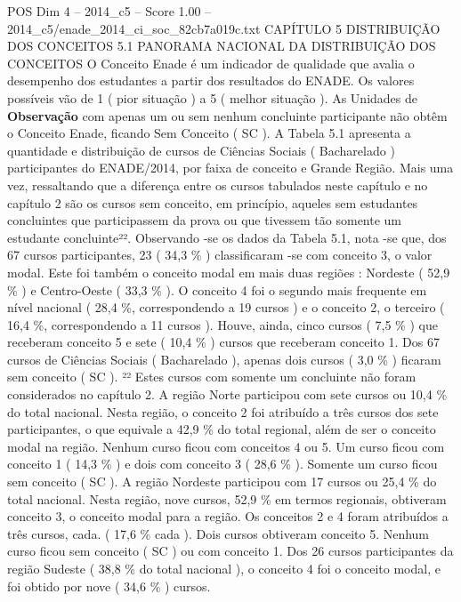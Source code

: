 \begin{textsample}{POS Dim 4 – 2014\_c5 – Score 1.00 – 2014\_c5/enade\_2014\_ci\_soc\_82cb7a019c.txt}  \label{ex:f4_pos_156}
CAPÍTULO 5 DISTRIBUIÇÃO DOS CONCEITOS 5.1 PANORAMA NACIONAL DA DISTRIBUIÇÃO DOS CONCEITOS O Conceito Enade é um indicador de qualidade que avalia o desempenho dos estudantes a partir dos resultados do ENADE.
Os valores possíveis vão de 1 ( pior situação ) a 5 ( melhor situação ).
As Unidades de \textbf{Observação} com apenas um ou sem nenhum concluinte participante não obtêm o Conceito Enade, ficando Sem Conceito ( SC ).
A Tabela 5.1 apresenta a quantidade e distribuição de cursos de Ciências Sociais ( Bacharelado ) participantes do ENADE/2014, por faixa de conceito e Grande Região.
Mais uma vez, ressaltando que a diferença entre os cursos tabulados neste capítulo e no capítulo 2 são os cursos sem conceito, em princípio, aqueles sem estudantes concluintes que participassem da prova ou que tivessem tão somente um estudante concluinte²².
Observando -se os dados da Tabela 5.1, nota -se que, dos 67 cursos participantes, 23 ( 34,3 \% ) classificaram -se com conceito 3, o valor modal.
Este foi também o conceito modal em mais duas regiões : Nordeste ( 52,9 \% ) e Centro-Oeste ( 33,3 \% ).
O conceito 4 foi o segundo mais frequente em nível nacional ( 28,4 \%, correspondendo a 19 cursos ) e o conceito 2, o terceiro ( 16,4 \%, correspondendo a 11 cursos ).
Houve, ainda, cinco cursos ( 7,5 \% ) que receberam conceito 5 e sete ( 10,4 \% ) cursos que receberam conceito 1.
Dos 67 cursos de Ciências Sociais ( Bacharelado ), apenas dois cursos ( 3,0 \% ) ficaram sem conceito ( SC ). ²² Estes cursos com somente um concluinte não foram considerados no capítulo 2.
A região Norte participou com sete cursos ou 10,4 \% do total nacional.
Nesta região, o conceito 2 foi atribuído a três cursos dos sete participantes, o que equivale a 42,9 \% do total regional, além de ser o conceito modal na região.
Nenhum curso ficou com conceitos 4 ou 5.
Um curso ficou com conceito 1 ( 14,3 \% ) e dois com conceito 3 ( 28,6 \% ).
Somente um curso ficou sem conceito ( SC ).
A região Nordeste participou com 17 cursos ou 25,4 \% do total nacional.
Nesta região, nove cursos, 52,9 \% em termos regionais, obtiveram conceito 3, o conceito modal para a região.
Os conceitos 2 e 4 foram atribuídos a três cursos, cada. ( 17,6 \% cada ).
Dois cursos obtiveram conceito 5.
Nenhum curso ficou sem conceito ( SC ) ou com conceito 1.
Dos 26 cursos participantes da região Sudeste ( 38,8 \% do total nacional ), o conceito 4 foi o conceito modal, e foi obtido por nove ( 34,6 \% ) cursos.

\end{textsample}
